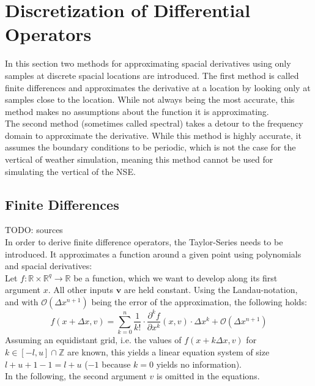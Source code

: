 \section{Discretization of Differential Operators}\label{section:diff_op}
In this section two methods for approximating spacial derivatives using only samples at discrete spacial locations are introduced.
The first method is called finite differences and approximates the derivative at a location by looking only at samples close to the location.
While not always being the most accurate, this method makes no assumptions about the function it is approximating.\\
The second method (sometimes called spectral) takes a detour to the frequency domain to approximate the derivative.
While this method is highly accurate, it assumes the boundary conditions to be periodic, which is not the case for the vertical of weather simulation, meaning this method cannot be used for simulating the vertical of the NSE.

\subsection{Finite Differences}
TODO: sources\\
In order to derive finite difference operators, the Taylor-Series needs to be introduced.
It approximates a function around a given point using polynomials and spacial derivatives:\\
Let $f:\mathbb{R}\times\mathbb{R}^q\rightarrow \mathbb{R}$ be a function, which we want to develop along its first argument $x$.
All other inputs $\boldsymbol{v}$ are held constant.
Using the Landau-notation, and with $\mathcal{O}(\Delta x ^{n+1})$ being the error of the approximation, the following holds:
\begin{equation}
f(x+\Delta x,v) = \sum_{k=0}^{n}\frac{1}{k!}\cdot\frac{\partial^k f}{\partial x ^k}(x,v)\cdot \Delta x^k + \mathcal{O}(\Delta x ^{n+1})
\end{equation}
Assuming an equidistant grid, i.e. the values of $f(x+k\Delta x,v)$ for $k\in [-l,u] \cap \mathbb{Z}$ are known, this yields a linear equation system of size $l + u + 1 - 1= l + u$ ($-1$ because $k=0$ yields no information).\\
In the following, the second argument $v$ is omitted in the equations.


